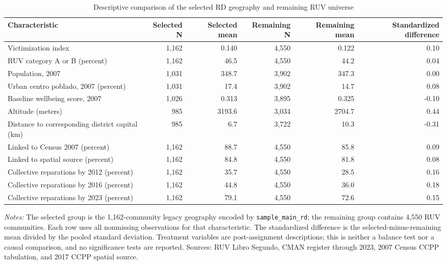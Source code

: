 \begin{table}[!htbp]
\centering
\caption{Descriptive comparison of the selected RD geography and remaining RUV universe}
\label{tab:desc_main_rd_sample_comparison}
\begin{tabular}{lrrrrr}
\toprule
Characteristic & Selected N & Selected mean & Remaining N & Remaining mean & Standardized difference \\
\midrule
Victimization index & 1,162 & 0.140 & 4,550 & 0.122 & 0.10 \\
RUV category A or B (percent) & 1,162 & 46.5 & 4,550 & 44.2 & 0.04 \\
Population, 2007 & 1,031 & 348.7 & 3,902 & 347.3 & 0.00 \\
Urban centro poblado, 2007 (percent) & 1,031 & 17.4 & 3,902 & 14.7 & 0.08 \\
Baseline wellbeing score, 2007 & 1,026 & 0.313 & 3,895 & 0.325 & -0.10 \\
Altitude (meters) & 985 & 3193.6 & 3,034 & 2704.7 & 0.44 \\
Distance to corresponding district capital (km) & 985 & 6.7 & 3,722 & 10.3 & -0.31 \\
Linked to Census 2007 (percent) & 1,162 & 88.7 & 4,550 & 85.8 & 0.09 \\
Linked to spatial source (percent) & 1,162 & 84.8 & 4,550 & 81.8 & 0.08 \\
Collective reparations by 2012 (percent) & 1,162 & 35.7 & 4,550 & 28.5 & 0.16 \\
Collective reparations by 2016 (percent) & 1,162 & 44.8 & 4,550 & 36.0 & 0.18 \\
Collective reparations by 2023 (percent) & 1,162 & 79.1 & 4,550 & 72.6 & 0.15 \\
\bottomrule
\end{tabular}
\parbox{0.99\linewidth}{\footnotesize \textit{Notes:} The selected group is the 1,162-community legacy geography encoded by \texttt{sample\_main\_rd}; the remaining group contains 4,550 RUV communities. Each row uses all nonmissing observations for that characteristic. The standardized difference is the selected-minus-remaining mean divided by the pooled standard deviation. Treatment variables are post-assignment descriptions; this is neither a balance test nor a causal comparison, and no significance tests are reported. Sources: RUV Libro Segundo, CMAN register through 2023, 2007 Census CCPP tabulation, and 2017 CCPP spatial source.}
\end{table}
